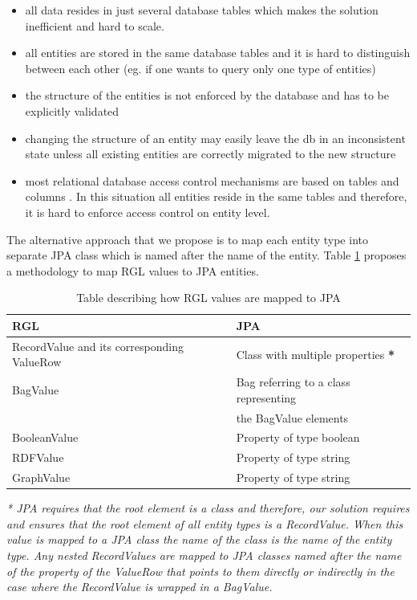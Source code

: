 \begin{itemize}
	\item all data resides in just several database tables which makes the solution inefficient and hard to scale.
	\item all entities are stored in the same database tables and it is hard to distinguish between each other (eg. if one wants to query only one type of entities)
	\item the structure of the entities is not enforced by the database and has to be explicitly validated
	\item changing the structure of an entity may easily leave the db in an inconsistent state unless all existing entities are correctly migrated to the new structure
	\item most relational database access control mechanisms are based on tables and columns \cite{olson2008formal}. In this situation all entities reside in the same tables and therefore, it is hard to enforce access control on entity level.
\end{itemize}

The alternative approach that we propose is to map each entity type into separate JPA class which is named after the name of the entity. Table \ref{tbl:rgl2gpa} proposes a methodology to map RGL values to JPA entities.

\begin{table}[h]
    \begin{tabular}{ | l | l |}
    \hline
    \textbf{RGL} & \textbf{JPA}  \\ \hline
    RecordValue and its corresponding ValueRow & Class with multiple properties \textbf{*}  \\ \hline
    BagValue & Bag referring to a class representing\\ & the BagValue elements \\ \hline
    BooleanValue & Property of type boolean  \\ \hline
    RDFValue & Property of type string  \\ \hline
	GraphValue & Property of type string  \\ \hline
	
    \end{tabular}
     \caption{Table describing how RGL values are mapped to JPA}
    \label{tbl:rgl2gpa}
\end{table}

\textit{* JPA requires that the root element is a class and therefore, our solution requires and ensures that the root element of all entity types is a RecordValue. When this value is mapped to a JPA class the name of the class is the name of the entity type. Any nested RecordValues are mapped to JPA classes named after the name of the property of the ValueRow that points to them directly or indirectly in the case where the RecordValue is wrapped in a BagValue.}

